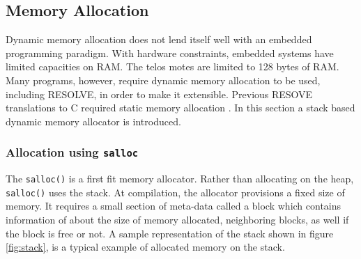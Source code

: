 \documentclass{sig-alternate}
\begin{document}








\subsection{Memory Allocation}

Dynamic memory allocation does not lend itself well with an embedded programming paradigm. With hardware constraints, embedded systems have limited capacities on RAM. The telos motes are limited to 128 bytes of RAM. Many programs, however, require dynamic memory allocation to be used, including RESOLVE, in order to make it extensible. Previous RESOVE translations to C required static memory allocation \cite{regula:2010}. In this section a stack based dynamic memory allocator is introduced.

\subsubsection{Allocation using \texttt{salloc}}

The \texttt{salloc()} is a first fit memory allocator. Rather than allocating on the heap, \texttt{salloc()} uses the stack. At compilation, the allocator provisions a fixed size of memory. It requires a small section of meta-data called a block which contains information of about the size of memory allocated, neighboring blocks, as well if the block is free or not. A sample representation of the stack shown in figure \ref{fig:stack}, is a typical example of allocated memory on the stack.
\end{document}
